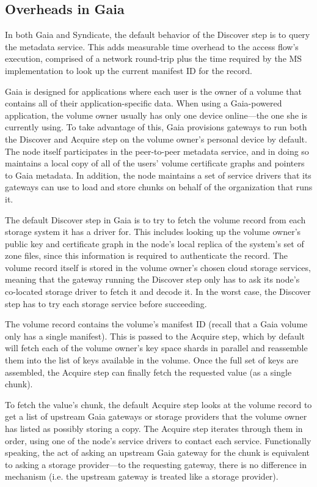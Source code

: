 \subsection{Overheads in Gaia}

In both Gaia and Syndicate, the default behavior of the Discover step is to query the
metadata service.  This adds measurable time overhead to the access flow's
execution, comprised of a network round-trip plus the time required by the MS
implementation to look up the current manifest ID for the record.

Gaia is designed for applications where each user is the owner of a volume that
contains all of their application-specific data.
When using a Gaia-powered application, the volume owner usually
has only one device online---the one she is
currently using.  To take advantage of this, Gaia provisions gateways to run 
both the Discover and Acquire step on the volume owner's personal device by
default.  The node itself participates in the peer-to-peer metadata service,
and in doing so maintains a local copy
of all of the users' volume certificate graphs and pointers to Gaia metadata.
In addition, the node maintains a set of service drivers that its gateways can use to load and store
chunks on behalf of the organization that runs it.

The default Discover step in Gaia is to try to fetch the volume record from each
storage system it has a driver for.  This includes
looking up the volume owner's public key and 
certificate graph in the node's local replica of
the system's set of zone files, since this information is required to
authenticate the record.  The volume record itself is stored in the volume
owner's chosen cloud storage services, meaning that the gateway running the
Discover step only has to ask its
node's co-located storage driver to fetch it and decode it.  In the worst case,
the Discover step has to try each storage service before succeeding.

The volume record contains the volume's manifest ID (recall that a Gaia volume
only has a single manifest).  This is passed to the Acquire step, which by
default will fetch each of the volume owner's key space shards in parallel and
reassemble them into the list of keys available in the volume.  Once the full
set of keys are assembled, the Acquire step can finally fetch the requested
value (as a single chunk).

To fetch the value's chunk, the default Acquire step looks at the volume record
to get a list of upstream Gaia gateways or storage providers that the volume
owner has listed as possibly storing a copy.  The Acquire step iterates through
them in order, using one of the node's service drivers to contact each service.
Functionally speaking, the act of asking an upstream Gaia gateway for the chunk is 
equivalent to asking a storage provider---to the requesting
gateway, there is no difference in mechanism (i.e. the upstream gateway is
treated like a storage provider).

